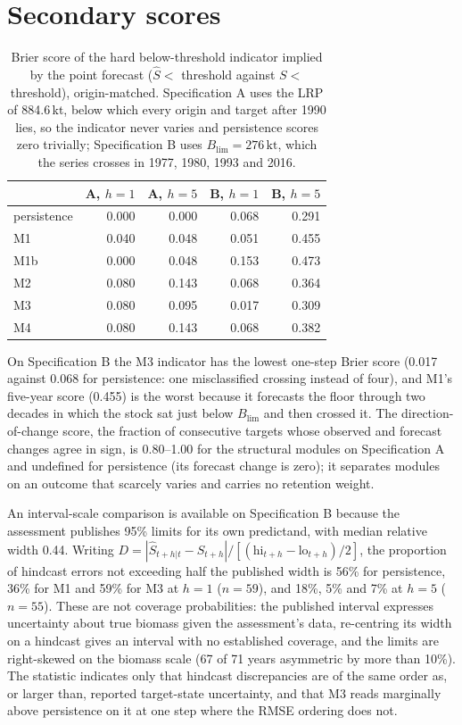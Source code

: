 \documentclass[preprint,11pt,authoryear]{elsarticle}
\theoremstyle{remark}
\newcommand{\kt}{\,\mathrm{kt}}
\newcommand{\Blim}{B_{\mathrm{lim}}}
\begin{document}
\FloatBarrier
\section{Secondary scores}\label{si:secondary}

\begin{table}[!htb]
\centering\footnotesize\setlength{\tabcolsep}{3.5pt}
\caption{Brier score of the hard below-threshold indicator implied by the point forecast ($\hat S < $ threshold against $S <$ threshold), origin-matched. Specification A uses the LRP of 884.6\,kt, below which every origin and target after 1990 lies, so the indicator never varies and persistence scores zero trivially; Specification B uses $\Blim = 276\kt$, which the series crosses in 1977, 1980, 1993 and 2016.}
\label{tab:si_brier}
\begin{tabular}{@{}lrrrr@{}}
\toprule
 & A, $h=1$ & A, $h=5$ & B, $h=1$ & B, $h=5$ \\
\midrule
persistence & 0.000 & 0.000 & 0.068 & 0.291 \\
M1 & 0.040 & 0.048 & 0.051 & 0.455 \\
M1b & 0.000 & 0.048 & 0.153 & 0.473 \\
M2 & 0.080 & 0.143 & 0.068 & 0.364 \\
M3 & 0.080 & 0.095 & 0.017 & 0.309 \\
M4 & 0.080 & 0.143 & 0.068 & 0.382 \\
\bottomrule
\end{tabular}
\end{table}

On Specification B the M3 indicator has the lowest one-step Brier score (0.017 against 0.068 for persistence: one misclassified crossing instead of four), and M1's five-year score (0.455) is the worst because it forecasts the floor through two decades in which the stock sat just below $\Blim$ and then crossed it. The direction-of-change score, the fraction of consecutive targets whose observed and forecast changes agree in sign, is 0.80--1.00 for the structural modules on Specification A and undefined for persistence (its forecast change is zero); it separates modules on an outcome that scarcely varies and carries no retention weight.

An interval-scale comparison is available on Specification B because the assessment publishes 95\% limits for its own predictand, with median relative width 0.44. Writing $D = |\hat S_{t+h|t} - S_{t+h}| / [(\mathrm{hi}_{t+h}-\mathrm{lo}_{t+h})/2]$, the proportion of hindcast errors not exceeding half the published width is 56\% for persistence, 36\% for M1 and 59\% for M3 at $h=1$ ($n=59$), and 18\%, 5\% and 7\% at $h=5$ ($n=55$). These are not coverage probabilities: the published interval expresses uncertainty about true biomass given the assessment's data, re-centring its width on a hindcast gives an interval with no established coverage, and the limits are right-skewed on the biomass scale (67 of 71 years asymmetric by more than 10\%). The statistic indicates only that hindcast discrepancies are of the same order as, or larger than, reported target-state uncertainty, and that M3 reads marginally above persistence on it at one step where the RMSE ordering does not.
\end{document}

